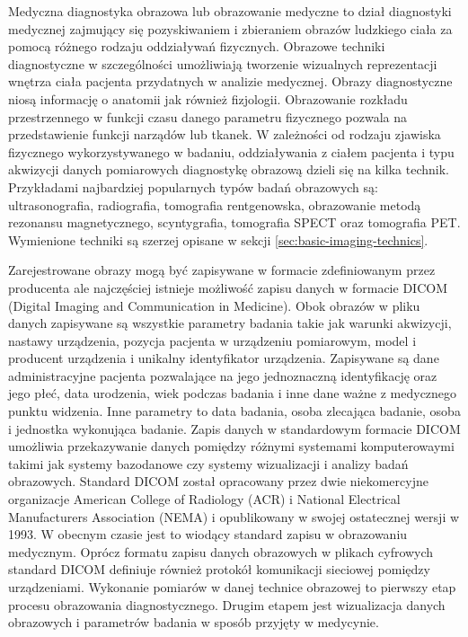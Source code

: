 Medyczna diagnostyka obrazowa lub obrazowanie medyczne to dział diagnostyki medycznej zajmujący się pozyskiwaniem i zbieraniem obrazów ludzkiego ciała za pomocą różnego rodzaju oddziaływań fizycznych.
Obrazowe techniki diagnostyczne w szczególności umożliwiają tworzenie wizualnych reprezentacji wnętrza ciała pacjenta przydatnych w analizie medycznej. Obrazy diagnostyczne niosą informację o anatomii jak również fizjologii.
Obrazowanie rozkładu przestrzennego w funkcji czasu danego parametru fizycznego pozwala na przedstawienie funkcji narządów lub tkanek.
W zależności od rodzaju zjawiska fizycznego wykorzystywanego w badaniu, oddziaływania z ciałem pacjenta i typu akwizycji danych pomiarowych diagnostykę obrazową dzieli się na kilka technik.
Przykładami najbardziej popularnych typów badań obrazowych są: ultrasonografia, radiografia, tomografia rentgenowska, obrazowanie metodą rezonansu magnetycznego, scyntygrafia, tomografia SPECT oraz tomografia PET.
Wymienione techniki są szerzej opisane w sekcji \ref{sec:basic-imaging-technics}.
\par
Zarejestrowane obrazy mogą być zapisywane w formacie zdefiniowanym przez producenta ale najczęściej istnieje możliwość zapisu danych w formacie DICOM (Digital Imaging and Communication in Medicine). 
Obok obrazów w pliku danych zapisywane są wszystkie parametry badania takie jak warunki akwizycji, nastawy urządzenia, pozycja pacjenta w urządzeniu pomiarowym, model i producent urządzenia i unikalny identyfikator urządzenia.
Zapisywane są dane administracyjne pacjenta pozwalające na jego jednoznaczną identyfikację oraz jego płeć, data urodzenia, wiek podczas badania i inne dane ważne z medycznego punktu widzenia.
Inne parametry to data badania, osoba zlecająca badanie, osoba i jednostka wykonująca badanie.
Zapis danych w standardowym formacie DICOM umożliwia przekazywanie danych pomiędzy różnymi systemami komputerowaymi takimi jak systemy bazodanowe czy systemy wizualizacji i analizy badań obrazowych.
Standard DICOM został opracowany przez dwie niekomercyjne organizacje American College of Radiology (ACR) i National Electrical Manufacturers Association (NEMA) i opublikowany w swojej ostatecznej wersji w 1993.
W obecnym czasie jest to wiodący standard zapisu w obrazowaniu medycznym.
Oprócz formatu zapisu danych obrazowych w plikach cyfrowych standard DICOM definiuje również protokół komunikacji sieciowej pomiędzy urządzeniami.
Wykonanie pomiarów w danej technice obrazowej to pierwszy etap procesu obrazowania diagnostycznego. Drugim etapem jest wizualizacja danych obrazowych i parametrów badania w sposób przyjęty w medycynie.
